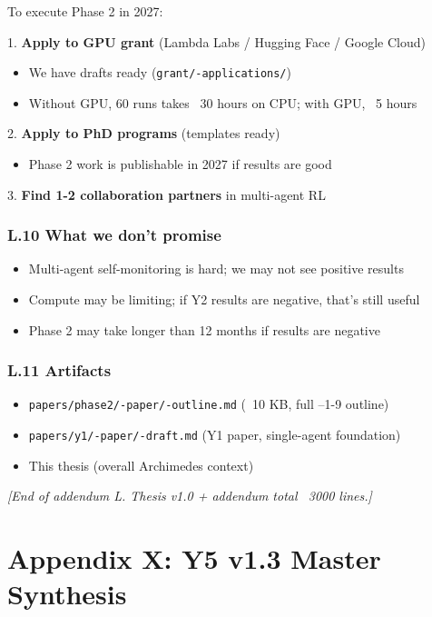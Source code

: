\documentclass[11pt]{article}
\begin{document}
To execute Phase 2 in 2027:

1. \textbf{Apply to GPU grant} (Lambda Labs / Hugging Face / Google Cloud)
\begin{itemize}
  \item We have drafts ready (\texttt{grant/-applications/})
  \item Without GPU, 60 runs takes ~30 hours on CPU; with GPU, ~5 hours
\end{itemize}

2. \textbf{Apply to PhD programs} (templates ready)
\begin{itemize}
  \item Phase 2 work is publishable in 2027 if results are good
\end{itemize}

3. \textbf{Find 1-2 collaboration partners} in multi-agent RL

\subsubsection{L.10 What we don't promise}

\begin{itemize}
  \item Multi-agent self-monitoring is hard; we may not see positive results
  \item Compute may be limiting; if Y2 results are negative, that's still useful
  \item Phase 2 may take longer than 12 months if results are negative
\end{itemize}


\subsubsection{L.11 Artifacts}

\begin{itemize}
  \item \texttt{papers/phase2/-paper/-outline.md} (~10 KB, full --1-9 outline)
  \item \texttt{papers/y1/-paper/-draft.md} (Y1 paper, single-agent foundation)
  \item This thesis (overall Archimedes context)
\end{itemize}


\hrulefill

\textit{[End of addendum L. Thesis v1.0 + addendum total ~3000 lines.]}



\newpage
\section*{Appendix X: Y5 v1.3 Master Synthesis}
\end{document}
